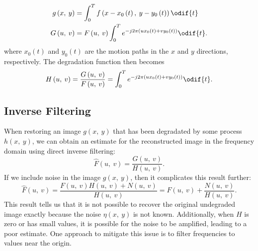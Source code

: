 \documentclass{article}
\begin{document}
\begin{itemize}
          \begin{align*}
              g\left( x,\: y \right) & = \int_0^T f\left( x - x_0\left( t \right),\: y - y_0\left( t \right) \right) \odif{t}                           \\
              G\left( u,\: v \right) & = F\left( u,\: v \right) \int_0^T e^{-j2\pi\left( ux_0\left( t \right) + vy_0\left( t \right) \right)} \odif{t}.
          \end{align*}
          where \(x_0\left( t \right)\) and \(y_0\left( t \right)\) are the
          motion paths in the \(x\) and \(y\) directions, respectively.
          The degradation function then becomes
          \begin{equation*}
              H\left( u,\: v \right) = \frac{G\left( u,\: v \right)}{F\left( u,\: v \right)} = \int_0^T e^{-j2\pi\left( ux_0\left( t \right) + vy_0\left( t \right) \right)} \odif{t}.
          \end{equation*}
\end{itemize}
\subsection{Inverse Filtering}
When restoring an image \(g\left( x,\: y \right)\) that has been
degradated by some process \(h\left( x,\: y \right)\), we can obtain an
estimate for the reconstructed image in the frequency domain using
direct inverse filtering:
\begin{equation*}
    \hat{F}\left( u,\: v \right) = \frac{G\left( u,\: v \right)}{H\left( u,\: v \right)}.
\end{equation*}
If we include noise in the image \(g\left( x,\: y \right)\), then it
complicates this result further:
\begin{equation*}
    \hat{F}\left( u,\: v \right) = \frac{F\left( u,\: v \right) H\left( u,\: v \right) + N\left( u,\: v \right)}{H\left( u,\: v \right)} = F\left( u,\: v \right) + \frac{N\left( u,\: v \right)}{H\left( u,\: v \right)}.
\end{equation*}
This result tells us that it is not possible to recover the original
undegraded image exactly because the noise \(\eta\left( x,\: y \right)\)
is not known. Additionally, when \(H\) is zero or has small values, it
is possible for the noise to be amplified, leading to a poor estimate.
One approach to mitigate this issue is to filter frequencies to values
near the origin.
\end{document}
